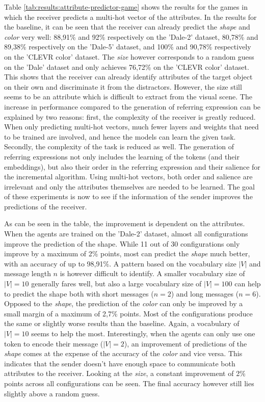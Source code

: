 Table \ref{tab:results:attribute-predictor-game} shows the results for the games in which the receiver predicts a multi-hot vector of the attributes.
In the results for the baseline, it can be seen that the receiver can already predict the \emph{shape} and \emph{color}  very well: 88,91\% and 92\% respectively on the 'Dale-2' dataset, 80,78\% and 89,38\% respectively on the 'Dale-5' dataset, and 100\% and 90,78\% respectively on the 'CLEVR color' dataset.
The \emph{size} however corresponds to a random guess on the 'Dale' dataset and only achieves 76,72\% on the 'CLEVR color' dataset.
This shows that the receiver can already identify attributes of the target object on their own and discriminate it from the distractors.
However, the size still seems to be an attribute which is difficult to extract from the visual scene.
The increase in performance compared to the generation of referring expression can be explained by two reasons:
first, the complexity of the receiver is greatly reduced.
When only predicting multi-hot vectors, much fewer layers and weights that need to be trained are involved, and hence the models can learn the given task.
Secondly, the complexity of the task is reduced as well.
The generation of referring expressions not only includes the learning of the tokens (and their embeddings), but also their order in the referring expression and their salience for the incremental algorithm.
Using multi-hot vectors, both order and salience are irrelevant and only the attributes themselves are needed to be learned.
The goal of these experiments is now to see if the information of the sender improves the predictions of the receiver.

As can be seen in the table, the improvement is dependent on the attributes.
When the agents are trained on the 'Dale-2' dataset, almost all configurations improve the prediction of the shape.
While 11 out of 30 configurations only improve by a maximum of 2\% points, most can predict the \emph{shape} much better, with an accuracy of up to 98,91\%.
A pattern based on the vocabulary size $|V|$ and message length $n$ is however difficult to identify.
A smaller vocabulary size of $|V|=10$ generally fares well, but also a large vocabulary size of $|V|=100$ can help to predict the shape both with short messages ($n=2$) and long messages ($n=6$).
Opposed to the \emph{shape}, the prediction of the \emph{color} can only be improved by a small margin of a maximum of 2,7\% points.
Most of the configurations produce the same or slightly worse results than the baseline.
Again, a vocabulary of $|V|=10$ seems to help the most.
Interestingly, when the agents can only use one token to encode their message ($|V|=2$), an improvement of predictions of the \emph{shape} comes at the expense of the accuracy of the \emph{color} and vice versa.
This indicates that the sender doesn't have enough space to communicate both attributes to the receiver.
Looking at the \emph{size}, a constant improvement of 2\% points across all configurations can be seen.
The final accuracy however still lies slightly above a random guess.

